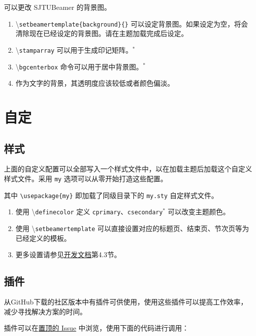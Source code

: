 \documentclass[
    UTF8,
    heading=true,
    12pt,
    a4paper
]{ctexrep}
\newenvironment{commentlist}{\begin{enumerate}\small}{\end{enumerate}}
\newcommand{\cmd}[1]{\textbackslash{}\texttt{#1}}
\newcommand{\opt}[1]{\texttt{#1}}
\def\themename{\textsf{SJTUBeamer}}
\begin{document}
可以更改 \themename{} 的背景图。


\begin{commentlist}
  \item \cmd{setbeamertemplate\{background\}\{\}} 可以设定背景图。如果设定为空，将会清除现在已经设定的背景图。请在主题加载完成后设定。
  \item \cmd{stamparray} 可以用于生成印记矩阵。$^*$
  \item \cmd{bgcenterbox} 命令可以用于居中背景图。$^*$
  \item 作为文字的背景，其透明度应该较低或者颜色偏淡。
\end{commentlist}

\chapter{自定}

\section{样式}

上面的自定义配置可以全部写入一个样式文件中，以在加载主题后加载这个自定义样式文件。采用 \texttt{my} 选项可以从零开始打造这些配置。


其中 \verb"\usepackage{my}" 即加载了同级目录下的 \verb"my.sty" 自定样式文件。


\begin{commentlist}
  \item 使用 \cmd{definecolor} 定义 \opt{cprimary}、\opt{csecondary}$^*$ 可以改变主题颜色。
  \item 使用 \cmd{setbeamertemplate} 可以直接设置对应的标题页、结束页、节次页等为已经定义的模板。
  \item 更多设置请参见\href{run:sjtubeamerdevguide.pdf}{开发文档}第4.3节。
\end{commentlist}

\section{插件}

从GitHub下载的社区版本中有插件可供使用，使用这些插件可以提高工作效率，减少寻找解决方案的时间。

插件可以在\href{https://github.com/sjtug/SJTUBeamer/issues/81}{置顶的 Issue} 中浏览，使用下面的代码进行调用：
\end{document}
